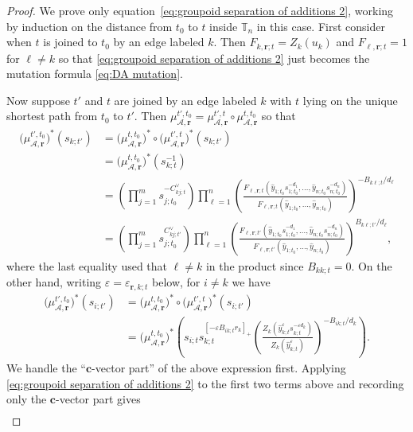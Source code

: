 \documentclass{amsart}
\numberwithin{equation}{section}
\newcommand{\bfc}{\mathbf{c}}
\newcommand{\bfr}{{\boldsymbol{r}}}
\newcommand{\cA}{\mathcal{A}}
\newcommand{\TT}{\mathbb{T}}
\begin{document}
\begin{proof}
  We prove only equation~\eqref{eq:groupoid separation of additions 2}, working by induction on the distance from $t_0$ to $t$ inside $\TT_n$ in this case.
  First consider when $t$ is joined to $t_0$ by an edge labeled $k$.
  Then $F_{k,\bfr;t}=Z_k(u_k)$ and $F_{\ell,\bfr;t}=1$ for $\ell\ne k$ so that \eqref{eq:groupoid separation of additions 2} just becomes the mutation formula \eqref{eq:DA mutation}.

  Now suppose $t'$ and $t$ are joined by an edge labeled $k$ with $t$ lying on the unique shortest path from $t_0$ to $t'$.
  Then $\mu_{\cA,\bfr}^{t',t_0}=\mu_{\cA,\bfr}^{t',t}\circ\mu_{\cA,\bfr}^{t,t_0}$ so that
  \begin{align*}
    \big(\mu_{\cA,\bfr}^{t',t_0}\big)^*(s_{k;t'})
    &=\big(\mu_{\cA,\bfr}^{t,t_0}\big)^*\circ\big(\mu_{\cA,\bfr}^{t',t}\big)^*(s_{k;t'})\\
    &=\big(\mu_{\cA,\bfr}^{t,t_0}\big)^*(s_{k;t}^{-1})\\
    &=\left(\prod_{j=1}^m s_{j;t_0}^{-C^\vee_{kj;t}}\right) \prod_{\ell=1}^n \left(\frac{F_{\ell,\bfr;t}(\hat y_{1;t_0} s_{1;t_0}^{-d_1},\ldots,\hat y_{n;t_0} s_{n;t_0}^{-d_n})}{F_{\ell,\bfr;t}(\hat y_{1;t_0},\ldots,\hat y_{n;t_0})}\right)^{-B_{k\ell;t}/d_\ell}\\
    &=\left(\prod_{j=1}^m s_{j;t_0}^{C^\vee_{kj;t'}}\right) \prod_{\ell=1}^n \left(\frac{F_{\ell,\bfr;t'}(\hat y_{1;t_0} s_{1;t_0}^{-d_1},\ldots,\hat y_{n;t_0} s_{n;t_0}^{-d_n})}{F_{\ell,\bfr;t'}(\hat y_{1;t_0},\ldots,\hat y_{n;t_0})}\right)^{B_{k\ell;t'}/d_\ell},
  \end{align*}
  where the last equality used that $\ell\ne k$ in the product since $B_{kk;t}=0$.
  On the other hand, writing $\varepsilon=\varepsilon_{\bfr,k;t}$ below, for $i\ne k$ we have
  \begin{align*}
    \big(\mu_{\cA,\bfr}^{t',t_0}\big)^*(s_{i;t'})
    &=\big(\mu_{\cA,\bfr}^{t,t_0}\big)^*\circ\big(\mu_{\cA,\bfr}^{t',t}\big)^*(s_{i;t'})\\
    &=\big(\mu_{\cA,\bfr}^{t,t_0}\big)^*\left(s_{i;t} s_{k;t}^{[-\varepsilon B_{ik;t} r_k]_+} \left(\frac{Z_k\left(\hat y_{k;t}^\varepsilon s_{k;t}^{-\varepsilon d_k}\right)}{Z_k(\hat y_{k;t}^\varepsilon)}\right)^{-B_{ik;t}/d_k}\right).
  \end{align*}
  We handle the ``$\bfc$-vector part'' of the above expression first.
  Applying \eqref{eq:groupoid separation of additions 2} to the first two terms above and recording only the $\bfc$-vector part gives
  \begin{align*}

\end{align*}
\end{proof}
\end{document}
